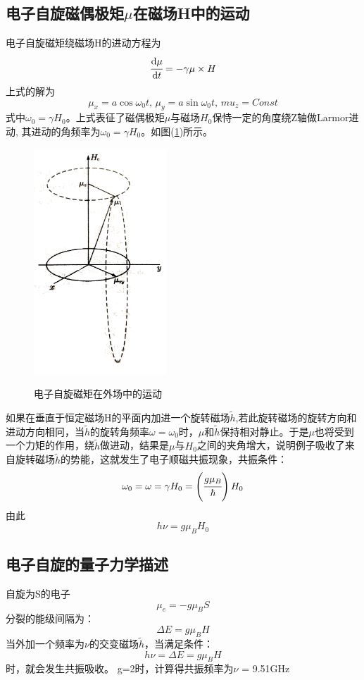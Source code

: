\documentclass[a4paper]{article}
\begin{document}
\subsection{电子自旋磁偶极矩$\mu$在磁场H中的运动}
电子自旋磁矩绕磁场H的进动方程为
\begin{equation}
\cfrac{\text{d}\mu}{\text{d}t} = -\gamma\mu\times H\label{eq6}
\end{equation}
上式的解为
\begin{equation}
\mu_x = a\cos\omega_0t\text{, }\mu_y = a\sin\omega_0t\text{, }
mu_z = Const\label{eq38}
\end{equation}
式中$\omega_0 = \gamma H_0$。上式表征了磁偶极矩$\mu$与磁场$H_0$保恃一定的角度绕Z轴做Larmor进动, 其进动的角频率为$\omega_0 = \gamma H_0$。如图(\ref{fig2})所示。
\begin{figure}[!h]
\centering
\includegraphics[width=5cm]{fig/fig2.jpg}\\
\caption{电子自旋磁矩在外场中的运动}\label{fig2}
\end{figure}
如果在垂直于恒定磁场H的平面内加进一个旋转磁场$\tilde{h}$,若此旋转磁场的旋转方向和进动方向相冋，当$\tilde{h}$的旋转角频率$\omega = \omega_0$时，$\mu$和$\tilde{h}$保持相对静止。于是$\mu$也将受到一个力矩的作用，绕$\tilde{h}$做进动，结果是$\mu$与$H_0$之间的夹角增大，说明例子吸收了来自旋转磁场$\tilde{h}$的势能，这就发生了电子顺磁共振现象，共振条件：
\begin{equation}
\omega_0 = \omega = \gamma H_0 = \left(\cfrac{g\mu_B}{\hbar}\right)H_0\label{eq9}
\end{equation}
由此
\begin{equation}
h\nu = g\mu_BH_0\label{eq10}
\end{equation}
\subsection{电子自旋的量子力学描述}
自旋为S的电子
\begin{equation}
\mu_e = -g\mu_BS\label{eq11}
\end{equation}
分裂的能级间隔为：
\begin{equation}
\Delta E = g\mu_B H\label{eq12}
\end{equation}
当外加一个频率为$\nu$的交变磁场$\tilde{h}$，当满足条件：
\begin{equation}
h\nu = \Delta E = g\mu_B H\label{eq13}
\end{equation}
时，就会发生共振吸收。
g=2时，计算得共振频率为$\nu$ = 9.51GHz
\end{document}
